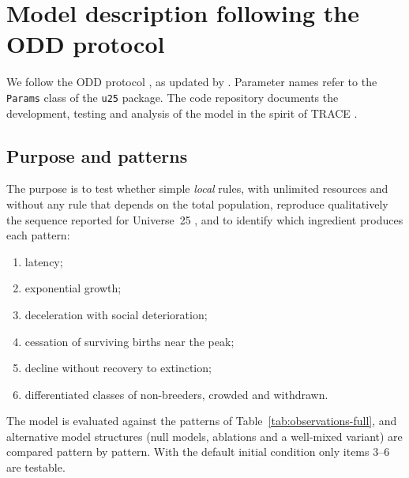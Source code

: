 \documentclass[preprint,12pt,authoryear]{elsarticle}
\begin{document}
\section{Model description following the ODD protocol}
\label{supp:odd}

We follow the ODD protocol \citep{Grimm2006,Grimm2010}, as updated by \citet{Grimm2020}. Parameter names refer to
the \texttt{Params} class of the \texttt{u25} package. The code repository documents the development, testing and
analysis of the model in the spirit of TRACE \citep{Grimm2014}.

\subsection*{Purpose and patterns}
The purpose is to test whether simple \emph{local} rules, with unlimited resources and without any rule that depends
on the total population, reproduce qualitatively the sequence reported for Universe~25 \citep{Calhoun1973}, and to
identify which ingredient produces each pattern:
\begin{enumerate}
\item latency;
\item exponential growth;
\item deceleration with social deterioration;
\item cessation of surviving births near the peak;
\item decline without recovery to extinction;
\item differentiated classes of non-breeders, crowded and withdrawn.
\end{enumerate}
The model is evaluated against the patterns of Table~\ref{tab:observations-full}, and alternative model structures
(null models, ablations and a well-mixed variant) are compared pattern by pattern. With the default initial
condition only items 3--6 are testable.
\end{document}
